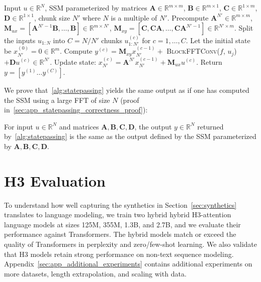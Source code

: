 \begin{algorithm}[h]
  \caption{\label{alg:statepassing} State Passing Algorithm}
  \small
  \begin{algorithmic}[1]
    \REQUIRE Input $u \in \mathbb{R}^{N}$, SSM parameterized by matrices $\mathbf{A} \in \mathbb{R}^{m \times m}$, $\mathbf{B} \in \mathbb{R}^{m \times 1}$, $\mathbf{C} \in \mathbb{R}^{1 \times m}$, $\mathbf{D} \in \mathbb{R}^{1 \times 1}$, chunk size $N'$ where $N$ is a multiple of $N'$.
    \STATE Precompute $\mathbf{A}^{N'} \in \mathbb{R}^{m \times m}$, $\mathbf{M}_{ux} = [\mathbf{A}^{N'-1}\mathbf{B}, \dots, \mathbf{B}] \in \mathbb{R}^{m \times N'}$, $\mathbf{M}_{xy} = [\mathbf{C}, \mathbf{C}\mathbf{A}, \dots, \mathbf{C}\mathbf{A}^{N'-1}] \in \mathbb{R}^{N' \times m}$.
    \STATE Split the inputs $u_{1:N}$ into $C = N/N'$ chunks $u_{1:N'}^{(c)}$ for $c=1, \dots, C$.
    \STATE Let the initial state be $x_{N'}^{(0)} = 0 \in \mathbb{R}^m$.
      \STATE Compute $y^{(c)} = \mathbf{M}_{xy} x_{N'}^{(c-1)} + $ \textsc{BlockFFTConv}($f$, $u_j$) $+ \mathbf{D} u^{(c)} \in \mathbb{R}^{N'}$.
      \STATE Update state: $x_{N'}^{(c)} = \mathbf{A}^{N'} x_{N'}^{(c-1)} + \mathbf{M}_{ux} u^{(c)}$.
    \ENDFOR
    \STATE Return $y = [y^{(1)} \dots y^{(C)}]$.
  \end{algorithmic}
\end{algorithm}

We prove that~\ref{alg:statepassing} yields the same output as if one has computed the SSM using a large FFT of size $N$ (proof in~\ref{sec:app_statepassing_correctness_proof}):

\begin{proposition}\label{thm:statepassing_correctness}
  For input $u \in \mathbb{R}^N$ and matrices $\mathbf{A}, \mathbf{B}, \mathbf{C}, \mathbf{D}$, the output $y \in \mathbb{R}^N$ returned by~\ref{alg:statepassing} is the same as the output defined by the SSM parameterized by $\mathbf{A}, \mathbf{B}, \mathbf{C}, \mathbf{D}$.
\end{proposition}

\section{\textsc{H3} Evaluation}
\label{sec:evaluation}

To understand how well capturing the synthetics in Section~\ref{sec:synthetics} translates to language modeling, we train two hybrid hybrid \textsc{H3}-attention language models at sizes 125M, 355M, 1.3B, and 2.7B, and we evaluate their performance against Transformers. The hybrid models match or exceed the quality of Transformers in perplexity and zero/few-shot learning. We also validate that \textsc{H3} models retain strong performance on non-text sequence modeling.
Appendix~\ref{sec:app_additional_experiments} contains additional experiments on more datasets, length extrapolation, and scaling with data.

